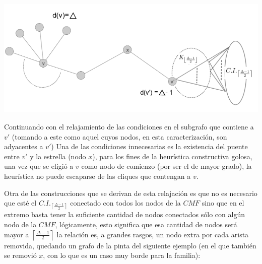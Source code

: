 \begin{center} 
	\includegraphics[scale = 0.6]{img/ej3/constructiva_golosa/vnotincmf_carac2.png} 
\end{center}

Continuando con el relajamiento de las condiciones en el subgrafo que contiene a $v'$
(tomando a este como aquel cuyos nodos, en esta caracterizaci\'on, son adyacentes a $v'$)
Una de las condiciones innecesarias es la existencia del puente entre $v'$ y la estrella 
(nodo $x$), para los fines de la heur\'istica constructiva golosa, una vez que se eligi\'o
a $v$ como nodo de comienzo (por ser el de mayor grado), la heur\'istica no puede escaparse
de las cliques que contengan a $v$. 

Otra de las construcciones que se derivan de esta relajaci\'on es que no es necesario
que est\'e el $C.I._{\left\lceil \frac{\Delta -1}{2} \right\rceil}$ conectado con 
todos los nodos de la $CMF$ sino que en el extremo basta tener la suficiente cantidad
de nodos conectados s\'olo con alg\'un nodo de la $CMF$, l\'ogicamente, esto significa
que esa cantidad de nodos ser\'a mayor a $\left\lceil \frac{\Delta -1}{2} \right\rceil$ 
la relaci\'on es, a grandes rasgos, un nodo extra por cada arista removida, quedando 
un grafo de la pinta del siguiente ejemplo (en el que tambi\'en se removi\'o $x$, con lo que es un caso muy borde para la familia):


